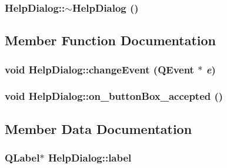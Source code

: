 \hypertarget{class_help_dialog_c5a870136e6629b27f4dc99878359ab5}{
\subsubsection[{$\sim$HelpDialog}]{\setlength{\rightskip}{0pt plus 5cm}HelpDialog::$\sim$HelpDialog ()}}
\label{class_help_dialog_c5a870136e6629b27f4dc99878359ab5}




\subsection{Member Function Documentation}
\hypertarget{class_help_dialog_ab243e3386d5f9758a8dc759bfb2ad04}{
\subsubsection[{changeEvent}]{\setlength{\rightskip}{0pt plus 5cm}void HelpDialog::changeEvent (QEvent $\ast$ {\em e})}}
\label{class_help_dialog_ab243e3386d5f9758a8dc759bfb2ad04}


\hypertarget{class_help_dialog_d37498b43165a28bf0adbc40d3c84da4}{
\subsubsection[{on\_\-buttonBox\_\-accepted}]{\setlength{\rightskip}{0pt plus 5cm}void HelpDialog::on\_\-buttonBox\_\-accepted ()}}
\label{class_help_dialog_d37498b43165a28bf0adbc40d3c84da4}




\subsection{Member Data Documentation}
\hypertarget{class_help_dialog_fc61068e18c599f9326b4b3b90957a6c}{
\subsubsection[{label}]{\setlength{\rightskip}{0pt plus 5cm}QLabel$\ast$ {\bf HelpDialog::label}}}
\label{class_help_dialog_fc61068e18c599f9326b4b3b90957a6c}


